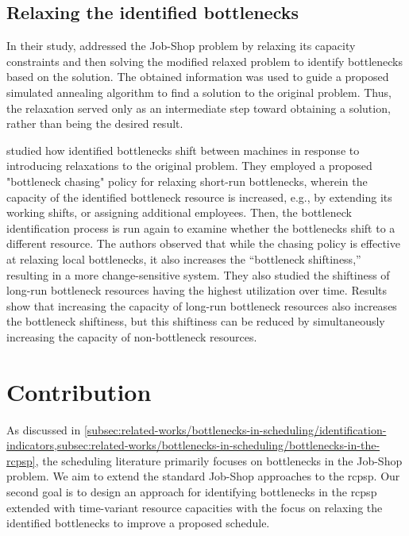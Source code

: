\subsection{Relaxing the identified bottlenecks} \label{subsec:related-works/bottlenecks-in-scheduling/relaxing-bottlenecks}

In their study, \citet{Zhang2012} addressed the Job-Shop problem by relaxing its capacity constraints
and then solving the modified relaxed problem to identify bottlenecks based on the solution.
The obtained information was used to guide a proposed simulated annealing
algorithm to find a solution to the original problem.
Thus, the relaxation served only as an intermediate step toward obtaining a solution,
rather than being the desired result.

\citet{Lawrence1994} studied how identified bottlenecks shift between machines
in response to introducing relaxations to the original problem.
They employed a proposed "bottleneck chasing" policy for relaxing short-run bottlenecks,
wherein the capacity of the identified bottleneck resource is increased,
e.g., by extending its working shifts, or assigning additional employees.
Then, the bottleneck identification process is run again to examine
whether the bottlenecks shift to a different resource.
The authors observed that while the chasing policy is effective at relaxing local bottlenecks,
it also increases the \enquote{bottleneck shiftiness,}
resulting in a more change-sensitive system.
They also studied the shiftiness of long-run bottleneck resources having the highest utilization over time.
Results show that increasing the capacity of long-run bottleneck resources also increases the bottleneck shiftiness,
but this shiftiness can be reduced by simultaneously increasing the capacity of non-bottleneck resources.

\section{Contribution} \label{sec:related-works/contribution}

As discussed in \cref{subsec:related-works/bottlenecks-in-scheduling/identification-indicators,subsec:related-works/bottlenecks-in-scheduling/bottlenecks-in-the-rcpsp},
the scheduling literature primarily focuses on bottlenecks in the Job-Shop problem.
We aim to extend the standard Job-Shop approaches to the \ac{rcpsp}.
Our second goal is to design an approach for identifying bottlenecks in the \ac{rcpsp}
extended with time-variant resource capacities
with the focus on relaxing the identified bottlenecks to improve a proposed schedule.
